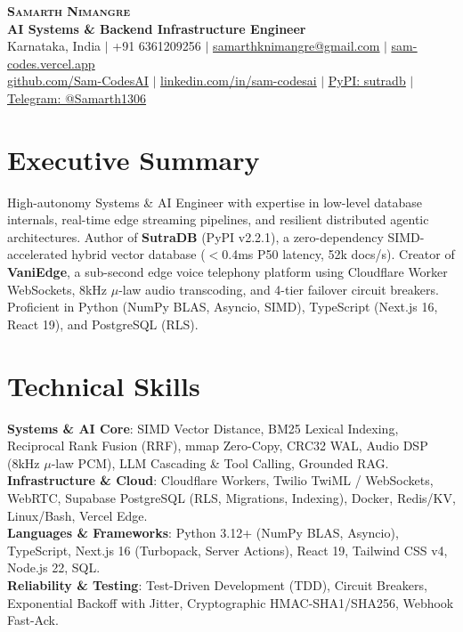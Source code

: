 \documentclass[letterpaper,10pt]{article}
\begin{document}
\begin{center}
    \textbf{\Huge \scshape Samarth Nimangre} \\ \vspace{2pt}
    \textbf{\small AI Systems \& Backend Infrastructure Engineer} \\ \vspace{2pt}
    \small Karnataka, India $|$ +91 6361209256 $|$ \href{mailto:samarthknimangre@gmail.com}{\underline{samarthknimangre@gmail.com}} $|$ \href{https://sam-codes.vercel.app}{\underline{sam-codes.vercel.app}} \\ \vspace{2pt}
    \small \href{https://github.com/Sam-CodesAI}{\underline{github.com/Sam-CodesAI}} $|$ \href{https://linkedin.com/in/sam-codesai}{\underline{linkedin.com/in/sam-codesai}} $|$ \href{https://pypi.org/project/sutradb/}{\underline{PyPI: sutradb}} $|$ \href{https://t.me/Samarth1306}{\underline{Telegram: @Samarth1306}}
\end{center}

\section{Executive Summary}
\small{High-autonomy Systems \& AI Engineer with expertise in low-level database internals, real-time edge streaming pipelines, and resilient distributed agentic architectures. Author of \textbf{SutraDB} (PyPI v2.2.1), a zero-dependency SIMD-accelerated hybrid vector database ($<$0.4ms P50 latency, 52k docs/s). Creator of \textbf{VaniEdge}, a sub-second edge voice telephony platform using Cloudflare Worker WebSockets, 8kHz $\mu$-law audio transcoding, and 4-tier failover circuit breakers. Proficient in Python (NumPy BLAS, Asyncio, SIMD), TypeScript (Next.js 16, React 19), and PostgreSQL (RLS).}

\section{Technical Skills}
\begin{itemize}[leftmargin=0.15in, label={}]
    \small{\item{
     \textbf{Systems \& AI Core}{: SIMD Vector Distance, BM25 Lexical Indexing, Reciprocal Rank Fusion (RRF), mmap Zero-Copy, CRC32 WAL, Audio DSP (8kHz $\mu$-law PCM), LLM Cascading \& Tool Calling, Grounded RAG.} \\
     \textbf{Infrastructure \& Cloud}{: Cloudflare Workers, Twilio TwiML / WebSockets, WebRTC, Supabase PostgreSQL (RLS, Migrations, Indexing), Docker, Redis/KV, Linux/Bash, Vercel Edge.} \\
     \textbf{Languages \& Frameworks}{: Python 3.12+ (NumPy BLAS, Asyncio), TypeScript, Next.js 16 (Turbopack, Server Actions), React 19, Tailwind CSS v4, Node.js 22, SQL.} \\
     \textbf{Reliability \& Testing}{: Test-Driven Development (TDD), Circuit Breakers, Exponential Backoff with Jitter, Cryptographic HMAC-SHA1/SHA256, Webhook Fast-Ack.}
    }}
\end{itemize}
\end{document}
